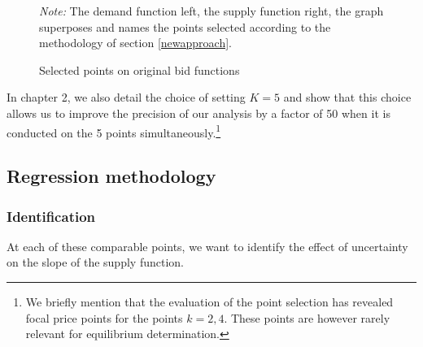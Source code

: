 \begin{figure}[!ht]
\begin{center} 
\end{center}
\caption{Selected points on original bid functions}
\emph{Note: } The demand function left, the supply function right, the graph superposes and names the points selected according to the methodology of section \ref{newapproach}.
\label{TypeallocK}
\end{figure}
 
In chapter 2, we also detail the choice of setting $K=5$ and show that this choice allows us to improve the precision of our analysis by a factor of 50 when it is conducted on the 5 points simultaneously.\footnote{We briefly mention that the evaluation of the point selection has revealed focal price points for the points $k=2,4$. These points are however rarely relevant for equilibrium determination.}

\subsection{Regression methodology}
\subsubsection{Identification}
\label{identification}
At each of these comparable points, we want to identify the effect of uncertainty on the slope of the supply function. \\

